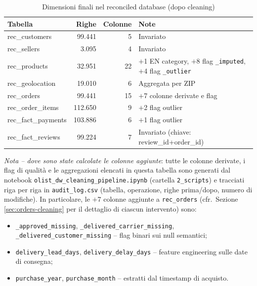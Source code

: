 \documentclass[12pt,a4paper]{article}
\begin{document}
\begin{table}[H]
  \centering
  \caption{Dimensioni finali nel reconciled database (dopo cleaning)}
  \label{tab:final}
  \begin{tabular}{lrrl}
    \toprule
    \textbf{Tabella} & \textbf{Righe} & \textbf{Colonne} & \textbf{Note} \\
    \midrule
    rec\_customers    &  99.441 &  5 & Invariato \\
    rec\_sellers      &   3.095 &  4 & Invariato \\
    rec\_products     &  32.951 & 22 & $+$1 EN category, $+$8 flag \texttt{\_imputed}, $+$4 flag \texttt{\_outlier} \\
    rec\_geolocation  &  19.010 &  6 & Aggregata per ZIP \\
    rec\_orders       &  99.441 & 15 & $+$7 colonne derivate e flag \\
    rec\_order\_items & 112.650 &  9 & $+$2 flag outlier \\
    rec\_fact\_payments & 103.886 &  6 & $+$1 flag outlier \\
    rec\_fact\_reviews  &  99.224 &  7 & Invariato (chiave: review\_id+order\_id) \\
    \bottomrule
  \end{tabular}
\end{table}

\begin{sloppypar}
\textit{Nota -- dove sono state calcolate le colonne aggiunte}: tutte le colonne
derivate, i flag di qualità e le aggregazioni elencati in questa tabella sono
generati dal notebook \texttt{olist\_dw\_cleaning\_pipeline.ipynb} (cartella
\texttt{2\_scripts}) e tracciati riga per riga in \texttt{audit\_log.csv}
(tabella, operazione, righe prima/dopo, numero di modifiche). In particolare,
le $+$7 colonne aggiunte a \texttt{rec\_orders} (cfr.\ Sezione
\ref{sec:orders-cleaning} per il dettaglio di ciascun intervento) sono:
\end{sloppypar}

\begin{itemize}
\sloppy
  \item \texttt{\_approved\_missing}, \texttt{\_delivered\_carrier\_missing},
        \texttt{\_delivered\_customer\_missing} -- flag binari sui null
        semantici;
  \item \texttt{delivery\_lead\_days}, \texttt{delivery\_delay\_days} --
        feature engineering sulle date di consegna;
  \item \texttt{purchase\_year}, \texttt{purchase\_month} -- estratti dal
        timestamp di acquisto.
\end{itemize}
\end{document}

